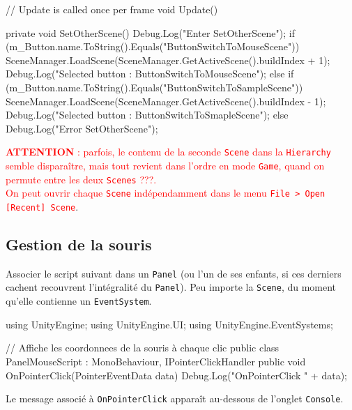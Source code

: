\documentclass[a4paper,10pt]{article}
\newenvironment{solution}%
{\begin{tcolorbox}[breakable,colback=red!5!white,colframe=red!75!black,title=Solution]}%
{\end{tcolorbox}}
\newenvironment{boxcode}%
{\begin{tcolorbox}[breakable,colback=gray!5!white,colframe=black]}%
	{\end{tcolorbox}}
\begin{document}
\begin{solution}
\begin{boxcode}
\begin{csharpsansbord}
{	// Update is called once per frame
	void Update() {	}
	
	private void SetOtherScene() {
		Debug.Log("Enter SetOtherScene");
		if (m_Button.name.ToString().Equals("ButtonSwitchToMouseScene")) {
			SceneManager.LoadScene(SceneManager.GetActiveScene().buildIndex + 1);
			Debug.Log("Selected button : ButtonSwitchToMouseScene");
		}
		else if (m_Button.name.ToString().Equals("ButtonSwitchToSampleScene")) {
			SceneManager.LoadScene(SceneManager.GetActiveScene().buildIndex - 1);
			Debug.Log("Selected button : ButtonSwitchToSmapleScene");
		}
		else {
			Debug.Log("Error SetOtherScene");
		}
	}
}

\end{csharpsansbord}
\end{boxcode}		

\textcolor{red}{\textbf{ATTENTION} : parfois, le contenu de la seconde \texttt{Scene} dans la \texttt{Hierarchy} semble disparaître, mais tout revient dans l'ordre en mode \texttt{Game}, quand on permute entre les deux \texttt{Scenes} ???. \\
On peut ouvrir chaque \texttt{Scene} indépendamment dans le menu \texttt{File > Open  [Recent] Scene}}.



\subsection{Gestion de la souris}
Associer le script  suivant dans un \texttt{Panel} (ou l'un de ses enfants, si ces derniers cachent recouvrent l'intégralité du \texttt{Panel}). Peu importe la \texttt{Scene}, du moment qu'elle contienne un \texttt{EventSystem}.

\begin{boxcode}
\begin{csharpsansbord}
using UnityEngine;
using UnityEngine.UI;
using UnityEngine.EventSystems;

// Affiche les coordonnees de la souris à chaque clic
public class PanelMouseScript : MonoBehaviour, IPointerClickHandler
{
	public void OnPointerClick(PointerEventData data)
	{
		Debug.Log("OnPointerClick " + data);
	}
}
\end{csharpsansbord}
\end{boxcode}

Le message associé à \texttt{OnPointerClick} apparaît au-dessous de l'onglet \texttt{Console}.
\end{solution}	
\fi 
\end{document}
